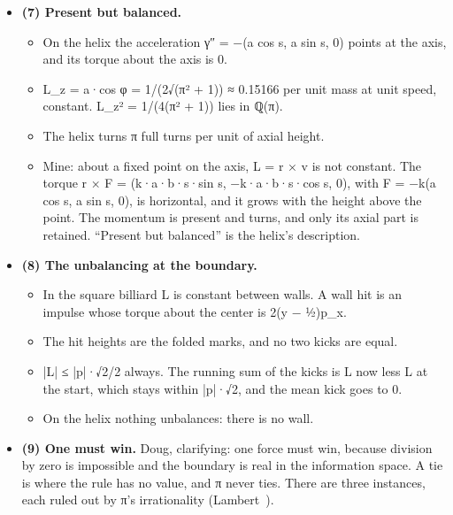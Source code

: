 \begin{itemize}
\begin{itemize}
\item A shifted start slides the whole etch rigidly: an isometry, Lyapunov exponent 0, ε stays ε, and the three gaps are the same. The rotation is uniquely ergodic (Weyl~\cite{src:Weyl-1916}; Walters~\cite{src:Walters-1982}): every start has the same long-run statistics. “The field starting conditions do not matter” holds, and “perturb it differently every time” is the shift.
\item A changed magnitude, with the direction constant, is Doug's wave (6). The rotations by α and by α + ε separate by nε after n encounters with the period 1: linearly, without end, and after about 1/ε encounters the two etches are unrelated. It is not chaos: the growth is linear instead of exponential.
\item Every irrational magnitude etches its own never-repeating pattern. A rational one closes.
\end{itemize}
\item \textbf{(7) Present but balanced.}

\begin{itemize}
\item On the helix the acceleration γ″ = −(a cos s, a sin s, 0) points at the axis, and its torque about the axis is 0.
\item L\_\allowbreak{}z = a·cos φ = 1/(2√(π² + 1)) ≈ 0.15166 per unit mass at unit speed, constant. L\_\allowbreak{}z² = 1/(4(π² + 1)) lies in ℚ(π).
\item The helix turns π full turns per unit of axial height.
\item Mine: about a fixed point on the axis, L = r × v is not constant. The torque r × F = (k·a·b·s·sin s, −k·a·b·s·cos s, 0), with F = −k(a cos s, a sin s, 0), is horizontal, and it grows with the height above the point. The momentum is present and turns, and only its axial part is retained. “Present but balanced” is the helix's description.
\end{itemize}
\item \textbf{(8) The unbalancing at the boundary.}

\begin{itemize}
\item In the square billiard L is constant between walls. A wall hit is an impulse whose torque about the center is 2(y − ½)p\_\allowbreak{}x.
\item The hit heights are the folded marks, and no two kicks are equal.
\item |L| ≤ |p|·√2/2 always. The running sum of the kicks is L now less L at the start, which stays within |p|·√2, and the mean kick goes to 0.
\item On the helix nothing unbalances: there is no wall.
\end{itemize}
\item \textbf{(9) One must win.} Doug, clarifying: one force must win, because division by zero is impossible and the boundary is real in the information space. A tie is where the rule has no value, and π never ties. There are three instances, each ruled out by π's irrationality (Lambert~\cite{src:Lambert-1761}).


\end{itemize}
